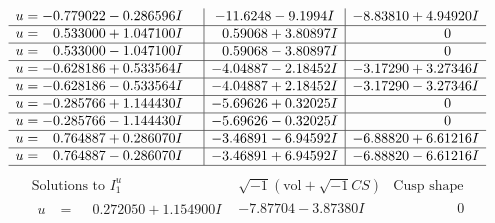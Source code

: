 \documentclass[1p]{elsarticle_modified}
\theoremstyle{definition}
\newcommand{\I}{\sqrt{-1}}
\begin{document}
$$\begin{array}{c|c|c}
\begin{aligned}
u &= -0.779022 - 0.286596 I\end{aligned}
 & -11.6248 - 9.1994 I & -8.83810 + 4.94920 I \\ \hline\begin{aligned}
u &= \phantom{-}0.533000 + 1.047100 I\end{aligned}
 & \phantom{-}0.59068 + 3.80897 I & \phantom{-0.000000 } 0 \\ \hline\begin{aligned}
u &= \phantom{-}0.533000 - 1.047100 I\end{aligned}
 & \phantom{-}0.59068 - 3.80897 I & \phantom{-0.000000 } 0 \\ \hline\begin{aligned}
u &= -0.628186 + 0.533564 I\end{aligned}
 & -4.04887 - 2.18452 I & -3.17290 + 3.27346 I \\ \hline\begin{aligned}
u &= -0.628186 - 0.533564 I\end{aligned}
 & -4.04887 + 2.18452 I & -3.17290 - 3.27346 I \\ \hline\begin{aligned}
u &= -0.285766 + 1.144430 I\end{aligned}
 & -5.69626 + 0.32025 I & \phantom{-0.000000 } 0 \\ \hline\begin{aligned}
u &= -0.285766 - 1.144430 I\end{aligned}
 & -5.69626 - 0.32025 I & \phantom{-0.000000 } 0 \\ \hline\begin{aligned}
u &= \phantom{-}0.764887 + 0.286070 I\end{aligned}
 & -3.46891 - 6.94592 I & -6.88820 + 6.61216 I \\ \hline\begin{aligned}
u &= \phantom{-}0.764887 - 0.286070 I\end{aligned}
 & -3.46891 + 6.94592 I & -6.88820 - 6.61216 I\\
 \hline 
 \end{array}$$\newpage$$\begin{array}{c|c|c}  
\text{Solutions to }I^u_{1}& \I (\text{vol} + \sqrt{-1}CS) & \text{Cusp shape}\\
 \hline 
\begin{aligned}
u &= \phantom{-}0.272050 + 1.154900 I\end{aligned}
 & -7.87704 - 3.87380 I & \phantom{-0.000000 } 0 \\ \hline\begin{aligned}

\end{aligned}
\end{array}$$
\end{document}
